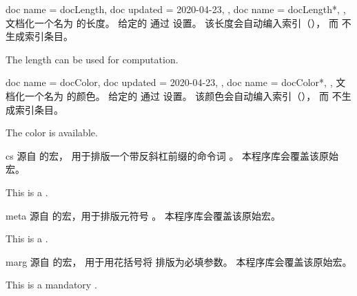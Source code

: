 \clearpage
\begin{docCommands}[doc parameter oarg marg={options}{name}]
  {
    {
      doc name    = docLength,
      doc updated = 2020-04-23,
    },
    {
      doc name = docLength*,
    },
  }
  文档化一个名为  的长度。
  给定的  通过  设置。
  该长度会自动编入索引（），
  而  不生成索引条目。
\begin{dispExample}
The length  can be used for computation.
\end{dispExample}
\end{docCommands}


\begin{docCommands}[doc parameter oarg marg={options}{name}]
  {
    {
      doc name    = docColor,
      doc updated = 2020-04-23,
    },
    {
      doc name = docColor*,
    },
  }
  文档化一个名为  的颜色。
  给定的  通过  设置。
  该颜色会自动编入索引（），
  而  不生成索引条目。
\begin{dispExample}
The color  is available.
\end{dispExample}
\end{docCommands}



\begin{docCommand}{cs}{}
  源自  \cite{carlisle:ltxdoc} 的宏，
  用于排版一个带反斜杠前缀的命令词 。
  本程序库会覆盖该原始宏。
\begin{dispExample}
This is a .
\end{dispExample}
\end{docCommand}

\begin{docCommand}{meta}{}
  源自  \cite{mittelbach:doc} 的宏，用于排版元符号 。
  本程序库会覆盖该原始宏。
\begin{dispExample}
This is a .
\end{dispExample}
\end{docCommand}


\begin{docCommand}{marg}{}
  源自  \cite{carlisle:ltxdoc} 的宏，
  用于用花括号将  排版为必填参数。
  本程序库会覆盖该原始宏。
\begin{dispExample}
This is a mandatory .
\end{dispExample}
\end{docCommand}

